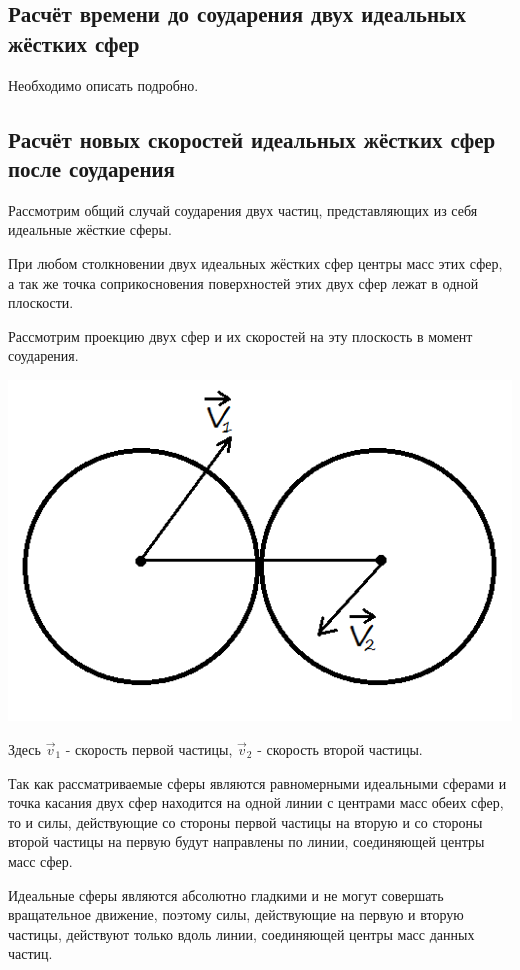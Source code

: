 \documentclass{article}
\begin{document}
\subsection{Расчёт времени до соударения двух идеальных жёстких сфер}
Необходимо описать подробно.

\subsection{Расчёт новых скоростей идеальных жёстких сфер после соударения}
Рассмотрим общий случай соударения двух частиц, представляющих из себя идеальные жёсткие сферы.

При любом столкновении двух идеальных жёстких сфер центры масс этих сфер, а так же точка соприкосновения поверхностей этих двух сфер лежат в одной плоскости.

Рассмотрим проекцию двух сфер и их скоростей на эту плоскость в момент соударения. 

\begin{center}
\includegraphics[scale=0.3]{collission_of_two_particles.png}
\end{center}

Здесь $ \vec{v}_1 $ - скорость первой частицы, $ \vec{v}_2 $ - скорость второй частицы.

Так как рассматриваемые сферы являются равномерными идеальными сферами и точка касания двух сфер находится на одной линии с центрами масс обеих сфер, то и силы, действующие со стороны первой частицы на вторую и со стороны второй частицы на первую будут направлены по линии, соединяющей центры масс сфер.

Идеальные сферы являются абсолютно гладкими и не могут совершать вращательное движение, поэтому силы, действующие на первую и вторую частицы, действуют только вдоль линии, соединяющей центры масс данных частиц.
\end{document}
